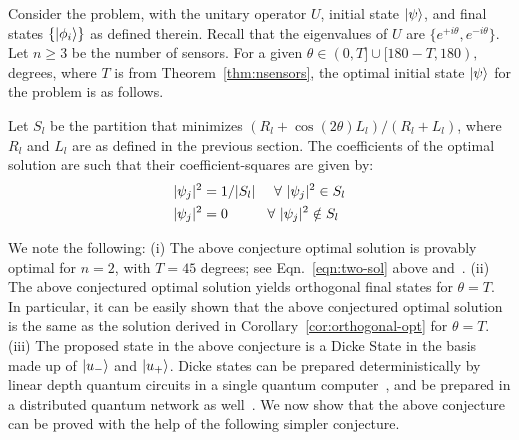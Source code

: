 



\medskip
\begin{conjecture}
\label{conj:opt}
Consider the \iso problem, with the unitary operator $U$, initial state $\ket{\psi}$,
and final states $\{\ket{\phi_i}\}$ as defined therein. Recall that the eigenvalues of
$U$ are $\{e^{+i\theta}, e^{-i\theta}\}$. Let $n \geq 3$ be the number of sensors.
For a given $\theta \in (0, T] \cup [180-T, 180),$ degrees, where $T$ is from Theorem~\ref{thm:nsensors}, the optimal initial state $\ket{\psi}$ for the \iso 
problem is as follows. 

Let $S_l$ be the partition 
that minimizes $(R_l + \cos(2\theta)L_l)/(R_l + L_l)$,
where $R_l$ and $L_l$ are as defined in the previous section. 
The coefficients of the optimal solution are such that their coefficient-squares are given by:
\begin{align*}
|\psi_j|^{2} &= 1/|S_l|\ \ \ \ \forall\ |\psi_j|^{2} \in S_l  \\
|\psi_j|^{2} &= 0\ \hspace{0.3in}   \ \forall\ |\psi_j|^{2} \notin S_l
\end{align*}
\label{thm:optimal}
\end{conjecture}
We note the following: (i) The above conjecture optimal solution is provably optimal for $n=2$, with $T = 45$ degrees; see Eqn.~\ref{eqn:two-sol} above and~\cite{PhysRevA.qsn}.
(ii) The above conjectured optimal solution yields orthogonal final states for $\theta = T$. 
In particular, it can be easily shown that the above conjectured optimal solution
is the same as the solution derived in Corollary~\ref{cor:orthogonal-opt} for $\theta = T$.
(iii) The proposed state in the above conjecture is a Dicke State in the basis made up of $\ket{u_{-}}$ and $\ket{u_{+}}$.
Dicke states can be prepared deterministically by linear depth quantum circuits in a single quantum computer~\cite{dicke_state}, and be prepared in a distributed quantum network as well~\cite{dickestate_distributed}.
We now show that the above conjecture can be proved with the help of the following simpler conjecture. 


